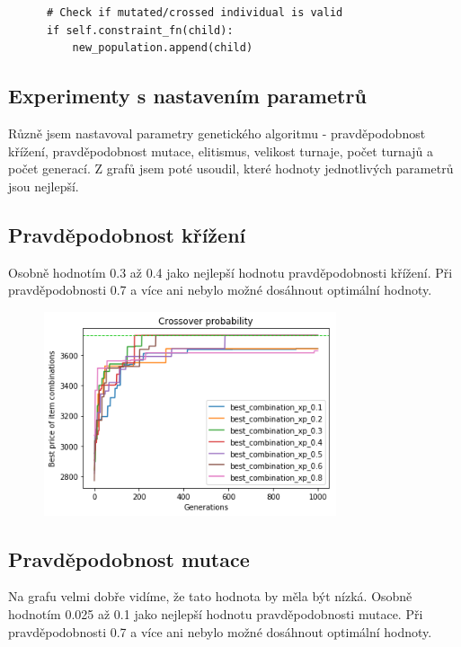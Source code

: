 \documentclass[a4paper,10pt,twocolumn]{article}
\begin{document}
\begin{itemize}
\begin{itemize}
\begin{verbatim}
      # Check if mutated/crossed individual is valid
      if self.constraint_fn(child):
          new_population.append(child)
   \end{verbatim}





\subsection{Experimenty s nastavením parametrů}


Různě jsem nastavoval parametry genetického algoritmu - pravděpodobnost křížení, pravděpodobnost mutace, elitismus, velikost turnaje, počet turnajů a počet generací. Z grafů jsem poté usoudil, které hodnoty jednotlivých parametrů jsou nejlepší.


\subsection{Pravděpodobnost křížení}

Osobně hodnotím 0.3 až 0.4 jako nejlepší hodnotu pravděpodobnosti křížení. Při pravděpodobnosti 0.7 a více ani nebylo možné dosáhnout optimální hodnoty.

\begin{figure}[H]
  \begin{center}
    \includegraphics[height=6cm]{graphs/xover_probability.png}
  \end{center}
\end{figure}

\subsection{Pravděpodobnost mutace}


Na grafu velmi dobře vidíme, že tato hodnota by měla být nízká.
Osobně hodnotím 0.025 až 0.1 jako nejlepší hodnotu pravděpodobnosti mutace. Při pravděpodobnosti 0.7 a více ani nebylo možné dosáhnout optimální hodnoty.


\end{itemize}
\end{itemize}
\end{document}
